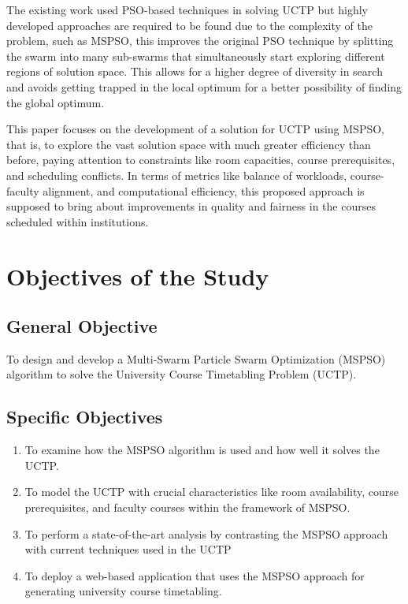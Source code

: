 \documentclass{article}
\begin{document}
The existing work \cite{Oswald_C2013-zo} \cite{Ali2014-mb} \cite{Chen2013-cp} used PSO-based techniques in solving UCTP but highly developed approaches are required to be found due to the complexity of the problem, such as MSPSO, this improves the original PSO technique by splitting the swarm into many sub-swarms that simultaneously start exploring different regions of solution space. This allows for a higher degree of diversity in search and avoids getting trapped in the local optimum for a better possibility of finding the global optimum.

This paper focuses on the development of a solution for UCTP using MSPSO, that is, to explore the vast solution space with much greater efficiency than before, paying attention to constraints like room capacities, course prerequisites, and scheduling conflicts. In terms of metrics like balance of workloads, course-faculty alignment, and computational efficiency, this proposed approach is supposed to bring about improvements in quality and fairness in the courses scheduled within institutions.

\section{Objectives of the Study}
\label{sec:objectives}

\subsection{General Objective}
\label{subsec:generalobjective}

To design and develop a Multi-Swarm Particle Swarm Optimization (MSPSO) algorithm to solve the University Course Timetabling Problem (UCTP).

\subsection{Specific Objectives}
\label{subsec:specificobjectives}
\begin{enumerate}
    \item To examine how the MSPSO algorithm is used and how well it solves the UCTP. 
    \item To model the UCTP with crucial characteristics like room availability, course prerequisites, and faculty courses within the framework of MSPSO. 
    \item To perform a state-of-the-art analysis by contrasting the MSPSO approach with current techniques used in the UCTP 
    \item To deploy a web-based application that uses the MSPSO approach for generating university course timetabling.
\end{enumerate}
\end{document}
